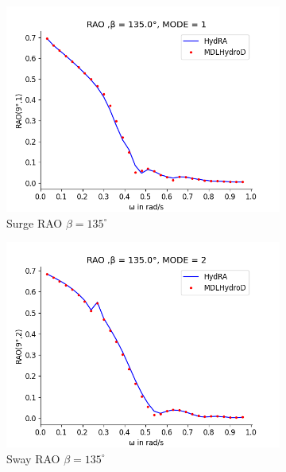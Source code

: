 \begin{figure}[H]
    \centering
    \begin{subfigure}[b]{0.49\textwidth}
        \includegraphics[width=\textwidth]{plots/kvlcc/rao2/rao1.png}
        \caption{Surge RAO $\beta = 135^{\circ}$}
    \end{subfigure}
    \begin{subfigure}[b]{0.49\textwidth}
        \includegraphics[width=\textwidth]{plots/kvlcc/rao2/rao2.png}
        \caption{Sway RAO $\beta = 135^{\circ}$}
    \end{subfigure}
    \vspace{5pt}%
    \begin{subfigure}[b]{0.49\textwidth}

\end{subfigure}
\end{figure}
